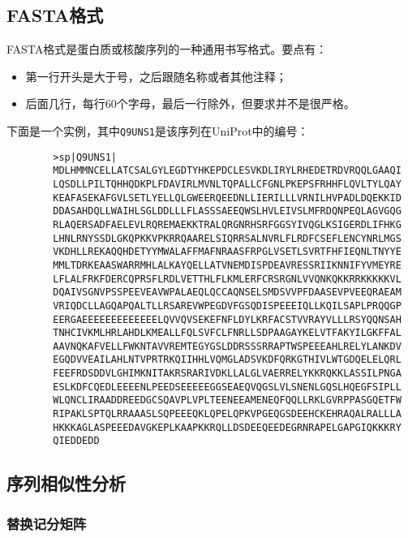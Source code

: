 \subsection{FASTA格式}

FASTA格式是蛋白质或核酸序列的一种通用书写格式。要点有：
\begin{itemize}
	\item 第一行开头是大于号，之后跟随名称或者其他注释；
	\item 后面几行，每行60个字母，最后一行除外，但要求并不是很严格。
\end{itemize}

下面是一个实例，其中\texttt{Q9UNS1}是该序列在UniProt中的编号：

\begin{verbatim}
		>sp|Q9UNS1|
		MDLHMMNCELLATCSALGYLEGDTYHKEPDCLESVKDLIRYLRHEDETRDVRQQLGAAQI
		LQSDLLPILTQHHQDKPLFDAVIRLMVNLTQPALLCFGNLPKEPSFRHHFLQVLTYLQAY
		KEAFASEKAFGVLSETLYELLQLGWEERQEEDNLLIERILLLVRNILHVPADLDQEKKID
		DDASAHDQLLWAIHLSGLDDLLLFLASSSAEEQWSLHVLEIVSLMFRDQNPEQLAGVGQG
		RLAQERSADFAELEVLRQREMAEKKTRALQRGNRHSRFGGSYIVQGLKSIGERDLIFHKG
		LHNLRNYSSDLGKQPKKVPKRRQAARELSIQRRSALNVRLFLRDFCSEFLENCYNRLMGS
		VKDHLLREKAQQHDETYYMWALAFFMAFNRAASFRPGLVSETLSVRTFHFIEQNLTNYYE
		MMLTDRKEAASWARRMHLALKAYQELLATVNEMDISPDEAVRESSRIIKNNIFYVMEYRE
		LFLALFRKFDERCQPRSFLRDLVETTHLFLKMLERFCRSRGNLVVQNKQKKRRKKKKKVL
		DQAIVSGNVPSSPEEVEAVWPALAEQLQCCAQNSELSMDSVVPFDAASEVPVEEQRAEAM
		VRIQDCLLAGQAPQALTLLRSAREVWPEGDVFGSQDISPEEEIQLLKQILSAPLPRQQGP
		EERGAEEEEEEEEEEEEELQVVQVSEKEFNFLDYLKRFACSTVVRAYVLLLRSYQQNSAH
		TNHCIVKMLHRLAHDLKMEALLFQLSVFCLFNRLLSDPAAGAYKELVTFAKYILGKFFAL
		AAVNQKAFVELLFWKNTAVVREMTEGYGSLDDRSSSRRAPTWSPEEEAHLRELYLANKDV
		EGQDVVEAILAHLNTVPRTRKQIIHHLVQMGLADSVKDFQRKGTHIVLWTGDQELELQRL
		FEEFRDSDDVLGHIMKNITAKRSRARIVDKLLALGLVAERRELYKKRQKKLASSILPNGA
		ESLKDFCQEDLEEEENLPEEDSEEEEEGGSEAEQVQGSLVLSNENLGQSLHQEGFSIPLL
		WLQNCLIRAADDREEDGCSQAVPLVPLTEENEEAMENEQFQQLLRKLGVRPPASGQETFW
		RIPAKLSPTQLRRAAASLSQPEEEQKLQPELQPKVPGEQGSDEEHCKEHRAQALRALLLA
		HKKKAGLASPEEEDAVGKEPLKAAPKKRQLLDSDEEQEEDEGRNRAPELGAPGIQKKKRY
		QIEDDEDD
\end{verbatim}

\subsection{序列相似性分析}

\subsubsection{替换记分矩阵}

